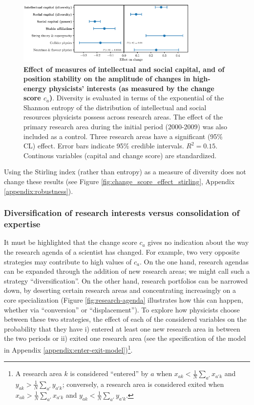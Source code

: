 \documentclass{article}
\begin{document}
\begin{figure}[h]
    \centering
    \includegraphics[width=0.8\textwidth]{plots/change_score_effects_entropy_magnitude.eps}
    \caption{\textbf{Effect of measures of intellectual and social capital, and of position stability on the amplitude of changes in high-energy physicists' interests (as measured by the change score $c_a$)}. Diversity is evaluated in terms of the exponential of the Shannon entropy of the distribution of intellectual and social resources physicists possess across research areas. The effect of the primary research area during the initial period (2000-2009) was also included as a control. Three research areas have a significant (95\% CL) effect. Error bars indicate 95\% credible intervals. $R^2=0.15$. Continous variables (capital and change score) are standardized.}
    \label{fig:change_score_effect}
\end{figure}

Using the Stirling index (rather than entropy) as a measure of diversity does not change these results (see Figure \ref{fig:change_score_effect_stirling}, Appendix \ref{appendix:robustness}).

\subsubsection{Diversification of research interests versus consolidation of expertise}

It must be highlighted that the change score $c_a$ gives no indication about the way the research agenda of a scientist has changed. For example, two very opposite strategies may contribute to high values of $c_a$. On the one hand, research agendas can be expanded through the addition of new research areas; we might call such a strategy ``diversification''. On the other hand, research portfolios can be narrowed down, by deserting certain research areas and concentrating increasingly on a core specialization (Figure \ref{fig:research-agenda} illustrates how this can happen, whether via ``conversion'' or ``displacement''). To explore how physicists choose between these two strategies, the effect of each of the considered variables on the probability that they have i) entered at least one new research area in between the two periods or ii) exited one research area (see the specification of the model in Appendix \ref{appendix:enter-exit-model})\footnote{A research area $k$ is considered ``entered'' by $a$ when $x_{ak}<\frac{1}{N}\sum_{a'}x_{a'k}$ and $y_{ak}>\frac{1}{N}\sum_{a'}y_{a'k}$; conversely, a research area is considered exited when $x_{ak}>\frac{1}{N}\sum_{a'}x_{a'k}$ and $y_{ak}<\frac{1}{N}\sum_{a'}y_{a'k}$.}.
\end{document}
